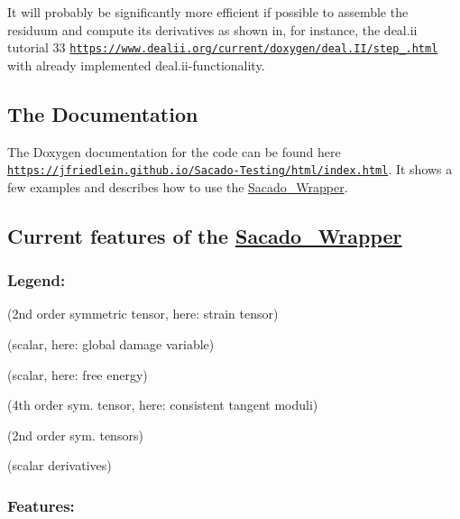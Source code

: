 It will probably be significantly more efficient if possible to assemble the residuum and compute its derivatives as shown in, for instance, the deal.\+ii tutorial 33 \href{https://www.dealii.org/current/doxygen/deal.II/step_33.html}{\tt https\+://www.\+dealii.\+org/current/doxygen/deal.\+I\+I/step\+\_.\+html} with already implemented deal.\+ii-\/functionality.

\subsection*{The Documentation}

The Doxygen documentation for the code can be found here \href{https://jfriedlein.github.io/Sacado-Testing/html/index.html}{\tt https\+://jfriedlein.\+github.\+io/\+Sacado-\/\+Testing/html/index.\+html}. It shows a few examples and describes how to use the \hyperlink{namespaceSacado__Wrapper}{Sacado\+\_\+\+Wrapper}.

\subsection*{Current features of the \hyperlink{namespaceSacado__Wrapper}{Sacado\+\_\+\+Wrapper}}

\subsubsection*{Legend\+:}

\href{https://www.codecogs.com/eqnedit.php?latex=\boldsymbol{\varepsilon}}{\tt } (2nd order symmetric tensor, here\+: strain tensor)

\href{https://www.codecogs.com/eqnedit.php?latex=\varphi}{\tt } (scalar, here\+: global damage variable)

\href{https://www.codecogs.com/eqnedit.php?latex=\Psi&space;=&space;\Psi(\boldsymbol{\varepsilon},\varphi)}{\tt } (scalar, here\+: free energy)

\href{https://www.codecogs.com/eqnedit.php?latex=\overset{4}{C}}{\tt } (4th order sym. tensor, here\+: consistent tangent moduli)

\href{https://www.codecogs.com/eqnedit.php?latex=\boldsymbol{A,&space;B,&space;E,&space;F}}{\tt } (2nd order sym. tensors)

\href{https://www.codecogs.com/eqnedit.php?latex=D,&space;G}{\tt } (scalar derivatives)

\subsubsection*{Features\+:}



